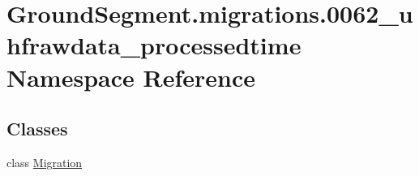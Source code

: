 \hypertarget{namespace_ground_segment_1_1migrations_1_10062__uhfrawdata__processedtime}{}\section{Ground\+Segment.\+migrations.0062\+\_\+uhfrawdata\+\_\+processedtime Namespace Reference}
\label{namespace_ground_segment_1_1migrations_1_10062__uhfrawdata__processedtime}
\subsection*{Classes}
\begin{DoxyCompactItemize}
\item 
class \hyperlink{class_ground_segment_1_1migrations_1_10062__uhfrawdata__processedtime_1_1_migration}{Migration}
\end{DoxyCompactItemize}
